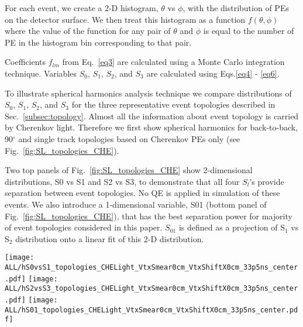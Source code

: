 For each event, we create a 2-D histogram, $\theta$ vs $\phi$, with the distribution of PEs on the detector surface. We then treat this histogram as a function $f(\theta,\phi)$ where the value of the function for any pair of $\theta$ and $\phi$ is equal to the number of PE in the histogram bin corresponding to that pair.

Coefficients $f_{lm}$ from Eq.~\ref{eq3} are calculated using a Monte Carlo integration technique. Variables $S_0$, $S_1$, $S_2$, and $S_3$ are calculated using Eqs.\ref{eq4} - \ref{eq6}.

To illustrate spherical harmonics analysis technique we compare distributions of $S_0$, $S_1$, $S_2$, and $S_3$ for the three representative event topologies described in Sec.~\ref{subsec:topology}. Almost all the information about event topology is carried by Cherenkov light. Therefore we first show spherical harmonics for back-to-back,  90$^{\circ}$ and single track topologies based on Cherenkov PEs only (see Fig.~\ref{fig:SL_topologies_CHE}).

Two top panels of Fig.~\ref{fig:SL_topologies_CHE} show 2-dimensional distributions, S0 vs S1 and S2 vs S3, to demonstrate that all four $S_l$'s provide separation between event topologies. No QE is applied in simulation of these events. We also introduce a 1-dimensional variable, S01 (bottom panel of Fig.~\ref{fig:SL_topologies_CHE}), that has the best separation power for majority of event topologies considered in this paper. $S_{01}$ is defined as a projection of S$_1$ vs S$_2$ distribution onto a linear fit of this 2-D distribution.

\begin{figure*}[h]
  \centering
  \texttt{[image: ALL/hS0vsS1\_topologies\_CHELight\_VtxSmear0cm\_VtxShiftX0cm\_33p5ns\_center.pdf]}
  \texttt{[image: ALL/hS2vsS3\_topologies\_CHELight\_VtxSmear0cm\_VtxShiftX0cm\_33p5ns\_center.pdf]}
  \texttt{[image: ALL/hS01\_topologies\_CHELight\_VtxSmear0cm\_VtxShiftX0cm\_33p5ns\_center.pdf]}
  \caption{Spherical harmonics for three event topologies: two
    back-to-back 1.26~MeV electrons (\emph{black squares and black
      dotted line}), two 1.26~MeV electrons at 90$^{\circ}$ angle
    (\emph{blue triangles and blue dashed line}), and a single
    2.529~MeV electron representing $^{8}$B background (\emph{red
      crosses and red solid line}). Simulation of 1000 events
    originated at the center of the sphere. Perfect separation between
    Cherenkov and scintillation light is implemented in this
    simulation by using only Cherenkov photons. \emph{Top left:} $S_0$
    versus $S_1$ scatter plot. Black dotted line is a linear fit of
    the 90$^{\circ}$ topology and $^{8}$B events. Variable $S_{01}$ is
    defined as a projection of 2D distribution onto this linear
    fit. \emph{Top right:} $S_2$ versus $S_3$ scatter
    plot. \emph{Bottom:} $S_{01}$ distributions for the three
    topologies. These distributions are normalized to unit area for
    shape comparison.}
  \label{fig:SL_topologies_CHE}
\end{figure*}


